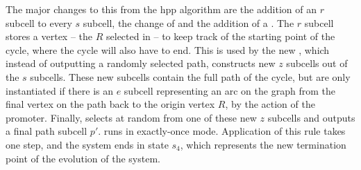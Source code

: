     
    
        
    
    
    

The major changes to this from the \gls{hpp} algorithm are the addition of an \(r\) subcell to every \(s\) subcell, the change of  and the addition of a . The \(r\) subcell stores a vertex -- the \(R\) selected in  -- to keep track of the starting point of the cycle, where the cycle will also have to end.  This is used by the new , which instead of outputting a randomly selected path, constructs new \(z\) subcells out of the \(s\) subcells.  These new subcells contain the full path of the cycle, but are only instantiated if there is an \(e\) subcell representing an arc on the graph from the final vertex on the path back to the origin vertex \(R\), by the action of the \gls{promoter}.  Finally,  selects at random from one of these new \(z\) subcells and outputs a final path subcell \(p'\).   runs in exactly-once mode.  Application of this rule takes one step, and the system ends in state \(s_4\), which represents the new termination point of the evolution of the system.

